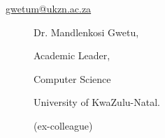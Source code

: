 \documentclass[12pt]{article}
\begin{document}
\begin{multicols}{2}
\begin{description}
\begin{description}
\item[\url{gwetum@ukzn.ac.za}] 
 \item[] Dr. Mandlenkosi Gwetu,
 \item[] Academic Leader,
 \item[] Computer Science
 \item[] University of KwaZulu-Natal.
 \item[] (ex-colleague) 
\item[]

 \end{description}
\end{description}

\end{multicols}





%
%
%
%
%
%
%
%
%
%
%
\end{document}
